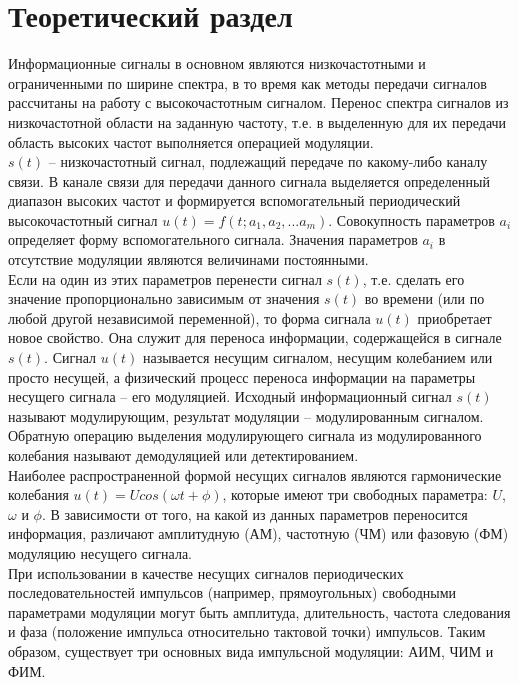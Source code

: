 \documentclass[a4paper]{article}
\begin{document}
\section{Теоретический раздел}
Информационные сигналы в основном являются низкочастотными и ограниченными по ширине спектра, в то время как методы передачи сигналов рассчитаны на работу с высокочастотным сигналом. Перенос спектра сигналов из низкочастотной области на заданную частоту, т.е. в выделенную для их передачи область высоких частот выполняется операцией модуляции.\\
$s(t)$ -- низкочастотный сигнал, подлежащий передаче по какому-либо каналу связи. В канале связи для передачи данного сигнала выделяется определенный диапазон высоких частот и формируется вспомогательный периодический высокочастотный сигнал $u(t) = f(t; a_1, a_2, ... a_m).$ Совокупность параметров $a_i$ определяет форму вспомогательного сигнала. Значения параметров $a_i$ в отсутствие модуляции являются величинами постоянными.\\
Если на один из этих параметров перенести сигнал $s(t)$, т.е. сделать его значение пропорционально зависимым от значения $s(t)$ во времени (или по любой другой независимой переменной), то форма сигнала $u(t)$ приобретает новое свойство. Она служит для переноса информации, содержащейся в сигнале $s(t)$. Сигнал $u(t)$ называется несущим сигналом, несущим колебанием или просто несущей, а физический процесс переноса информации на параметры несущего сигнала -- его модуляцией. Исходный информационный сигнал $s(t)$ называют модулирующим, результат модуляции -- модулированным сигналом. Обратную операцию выделения модулирующего сигнала из модулированного колебания называют демодуляцией или детектированием.\\
Наиболее распространенной формой несущих сигналов являются гармонические колебания $u(t)=Ucos(\omega t+\phi)$, которые имеют три свободных параметра: $U$, $\omega$ и $\phi$. В зависимости от того, на какой из данных параметров переносится информация, различают амплитудную (АМ), частотную (ЧМ) или фазовую (ФМ) модуляцию несущего сигнала.\\
При использовании в качестве несущих сигналов периодических последовательностей импульсов (например, прямоугольных) свободными параметрами модуляции могут быть амплитуда, длительность, частота следования и фаза (положение импульса относительно тактовой точки) импульсов. Таким образом, существует три основных вида импульсной модуляции: АИМ, ЧИМ и ФИМ.
\end{document}
